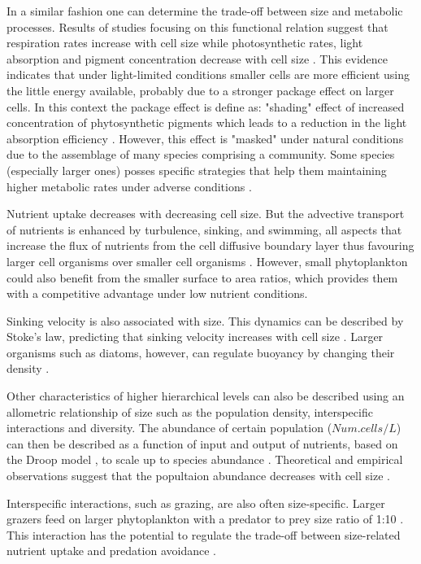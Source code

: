 In a similar fashion one can determine the trade-off between size and metabolic processes. Results of studies focusing on this functional relation suggest that respiration rates increase with cell size \citep{Laws1975, Lopez-Urrutia2006} while photosynthetic rates, light absorption and pigment concentration decrease with cell size \citep{Ciotti2002,Finkel2004}. This evidence indicates that under light-limited conditions smaller cells are more efficient using the little energy available, probably due to a stronger package effect on larger cells. In this context the package effect is define as: "shading" effect of increased concentration of phytosynthetic pigments  which leads to a reduction in the light absorption efficiency \citep{Maranon2009}. However, this effect is "masked" under natural conditions due to the assemblage of many species comprising a community. Some species (especially larger ones) posses specific strategies that help them maintaining higher metabolic rates under adverse conditions \citep{Maranon2009}. 

Nutrient uptake decreases with decreasing cell size. But the advective transport of nutrients is enhanced by turbulence, sinking, and swimming, all aspects that increase the flux of nutrients from the cell diffusive boundary layer thus favouring larger cell organisms over smaller cell organisms \citep{Kiorboe1993}. However, small phytoplankton could also benefit from the smaller surface to area ratios, which provides them with a competitive advantage under low nutrient conditions.

Sinking velocity is also associated with size. This dynamics can be described by Stoke's law, predicting that sinking velocity increases with cell size \citep{Reynolds2006}. Larger organisms such as diatoms, however, can regulate buoyancy by changing their density \citep{Reynolds2006}. 

Other characteristics of higher hierarchical levels can also be described using an allometric relationship of size such as the population density, interspecific interactions and diversity. The abundance of certain population ($Num.cells/L$) can then be described as a function of input and output of nutrients, based on the Droop model \citep{Droop1977}, to scale up to species abundance \citep{Irwin2006}. Theoretical and empirical observations suggest that the popultaion abundance decreases with cell size \citep{Irwin2006,Cermeno2008}. 

Interspecific interactions, such as grazing, are also often size-specific. Larger grazers feed on larger phytoplankton with a predator to prey size ratio of 1:10 \citep{Kiorboe1993}. This interaction has the potential to regulate the trade-off between size-related nutrient uptake and predation avoidance \citep{Thingstad2005,Naselli-Flores2007}. 

